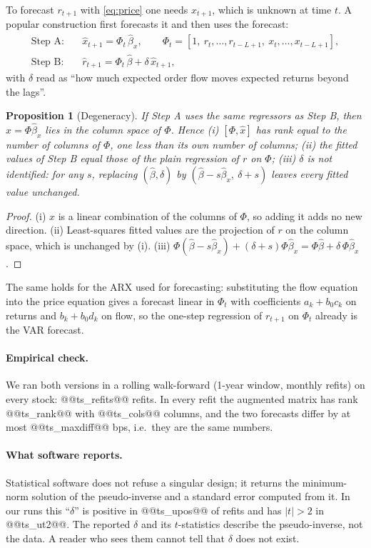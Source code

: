 \documentclass[11pt,a4paper]{article}
\newtheorem{proposition}{Proposition}
\begin{document}
To forecast $r_{t+1}$ with \eqref{eq:price} one needs $x_{t+1}$, which is unknown at time $t$. A popular
construction first forecasts it and then uses the forecast:
\begin{align*}
\text{Step A:}\quad & \hat x_{t+1} = \Phi_t\,\hat\beta_x, \qquad \Phi_t=[1,\ r_t,\dots,r_{t-L+1},\ x_t,\dots,x_{t-L+1}],\\
\text{Step B:}\quad & \hat r_{t+1} = \Phi_t\,\hat\beta + \delta\,\hat x_{t+1},
\end{align*}
with $\delta$ read as ``how much expected order flow moves expected returns beyond the lags''.

\begin{proposition}[Degeneracy]
\label{prop:twostep}
If Step A uses the same regressors as Step B, then $\hat x = \Phi\hat\beta_x$ lies in the column space of
$\Phi$. Hence (i) $[\Phi,\hat x]$ has rank equal to the number of columns of $\Phi$, one less than its own
number of columns; (ii) the fitted values of Step B equal those of the plain regression of $r$ on $\Phi$;
(iii) $\delta$ is not identified: for any $s$, replacing $(\hat\beta,\delta)$ by
$(\hat\beta - s\hat\beta_x,\ \delta+s)$ leaves every fitted value unchanged.
\end{proposition}
\begin{proof}
(i) $\hat x$ is a linear combination of the columns of $\Phi$, so adding it adds no new direction.
(ii) Least-squares fitted values are the projection of $r$ on the column space, which is unchanged by (i).
(iii) $\Phi(\hat\beta-s\hat\beta_x)+(\delta+s)\Phi\hat\beta_x = \Phi\hat\beta+\delta\,\Phi\hat\beta_x$.
\end{proof}

The same holds for the ARX used for forecasting: substituting the flow equation into the price equation
gives a forecast linear in $\Phi_t$ with coefficients $a_k+b_0c_k$ on returns and $b_k+b_0d_k$ on flow, so
the one-step regression of $r_{t+1}$ on $\Phi_t$ already is the VAR forecast.

\paragraph{Empirical check.} We ran both versions in a rolling walk-forward (1-year window, monthly
refits) on every stock: @@ts_refits@@ refits. In every refit the augmented matrix has rank @@ts_rank@@
with @@ts_cols@@ columns, and the two forecasts differ by at most @@ts_maxdiff@@ bps, i.e.\ they are the
same numbers.

\paragraph{What software reports.} Statistical software does not refuse a singular design; it returns
the minimum-norm solution of the pseudo-inverse and a standard error computed from it. In our runs this
``$\delta$'' is positive in @@ts_upos@@ of refits and has $|t|>2$ in @@ts_ut2@@. The reported $\delta$ and its $t$-statistics describe the pseudo-inverse, not the data. A reader who sees them cannot tell that $\delta$ does not exist.
\end{document}
